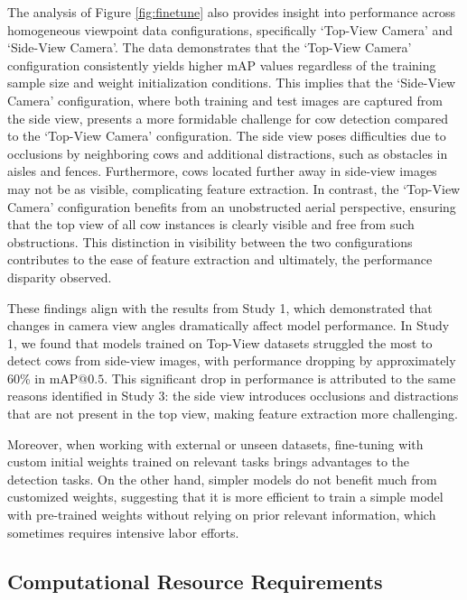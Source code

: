 The analysis of Figure \ref{fig:finetune} also provides insight into performance across homogeneous viewpoint data configurations, specifically `Top-View Camera' and `Side-View Camera'. The data demonstrates that the `Top-View Camera' configuration consistently yields higher mAP values regardless of the training sample size and weight initialization conditions. This implies that the `Side-View Camera' configuration, where both training and test images are captured from the side view, presents a more formidable challenge for cow detection compared to the `Top-View Camera' configuration. The side view poses difficulties due to occlusions by neighboring cows and additional distractions, such as obstacles in aisles and fences. Furthermore, cows located further away in side-view images may not be as visible, complicating feature extraction. In contrast, the `Top-View Camera' configuration benefits from an unobstructed aerial perspective, ensuring that the top view of all cow instances is clearly visible and free from such obstructions. This distinction in visibility between the two configurations contributes to the ease of feature extraction and ultimately, the performance disparity observed.

These findings align with the results from Study 1, which demonstrated that changes in camera view angles dramatically affect model performance. In Study 1, we found that models trained on Top-View datasets struggled the most to detect cows from side-view images, with performance dropping by approximately 60\% in $\text{mAP@{0.5}}$. This significant drop in performance is attributed to the same reasons identified in Study 3: the side view introduces occlusions and distractions that are not present in the top view, making feature extraction more challenging.

Moreover, when working with external or unseen datasets, fine-tuning with custom initial weights trained on relevant tasks brings advantages to the detection tasks. On the other hand, simpler models do not benefit much from customized weights, suggesting that it is more efficient to train a simple model with pre-trained weights without relying on prior relevant information, which sometimes requires intensive labor efforts.


\subsection*{Computational Resource Requirements}

